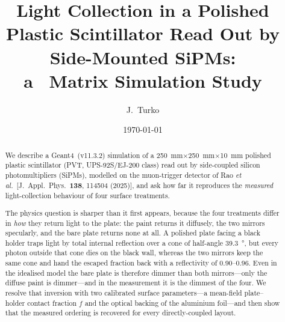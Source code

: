 \documentclass[11pt,a4paper]{article}
\title{\vspace{-1.2cm}\bfseries Light Collection in a Polished Plastic Scintillator Read Out by Side-Mounted SiPMs:\\ a \gfour\ Matrix Simulation Study}
\author{J.~Turko}
\date{\today}
\newcommand{\gfour}{Geant4}
\begin{document}
\maketitle

\begin{abstract}
\noindent
We describe a \gfour\ (v11.3.2) simulation of a
\SI{250}{\milli\meter}$\times$\SI{250}{\milli\meter}$\times$\SI{10}{\milli\meter} polished
plastic scintillator (PVT, UPS-92S/EJ-200 class) read out by side-coupled
silicon photomultipliers (SiPMs), modelled on the muon-trigger detector of
Rao \emph{et al.}\ [J.~Appl.\ Phys.\ \textbf{138}, 114504 (2025)], and ask how
far it reproduces the \emph{measured} light-collection behaviour of four
surface treatments.

The physics question is sharper than it first appears, because the four
treatments differ in \emph{how} they return light to the plate: the paint
returns it diffusely, the two mirrors specularly, and the bare plate returns
none at all. A polished plate facing a black holder traps light by total
internal reflection over a cone of half-angle \SI{39.3}{\degree}, but every
photon outside that cone dies on the black wall, whereas the two mirrors keep
the same cone and hand the escaped fraction back with a reflectivity of
\num{0.90}--\num{0.96}. Even in the idealised model the bare plate is
therefore dimmer than both mirrors---only the diffuse paint is dimmer---and
in the measurement it is the dimmest of the four. We resolve that inversion
with two calibrated surface
parameters---a mean-field plate--holder contact fraction $f$ and the optical
backing of the aluminium foil---and then show that the measured ordering is
recovered for every directly-coupled layout.


\end{abstract}
\end{document}

